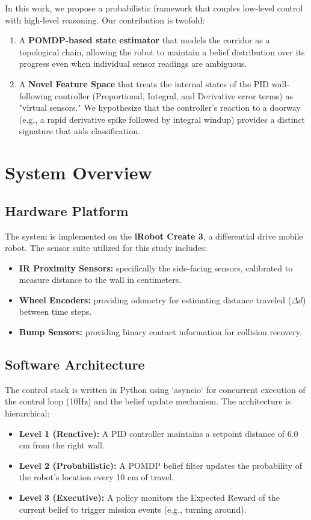 \documentclass[10pt, twocolumn]{article}
\begin{document}
In this work, we propose a probabilistic framework that couples low-level control with high-level reasoning. Our contribution is twofold:
\begin{enumerate}
    \item A \textbf{POMDP-based state estimator} that models the corridor as a topological chain, allowing the robot to maintain a belief distribution over its progress even when individual sensor readings are ambiguous.
    \item A \textbf{Novel Feature Space} that treats the internal states of the PID wall-following controller (Proportional, Integral, and Derivative error terms) as "virtual sensors." We hypothesize that the controller's reaction to a doorway (e.g., a rapid derivative spike followed by integral windup) provides a distinct signature that aids classification.
\end{enumerate}

\section{System Overview}
\subsection{Hardware Platform}
The system is implemented on the \textbf{iRobot Create 3}, a differential drive mobile robot. The sensor suite utilized for this study includes:
\begin{itemize}
    \item \textbf{IR Proximity Sensors:} specifically the side-facing sensors, calibrated to measure distance to the wall in centimeters.
    \item \textbf{Wheel Encoders:} providing odometry for estimating distance traveled (\(\Delta d\)) between time steps.
    \item \textbf{Bump Sensors:} providing binary contact information for collision recovery.
\end{itemize}

\subsection{Software Architecture}
The control stack is written in Python using `asyncio` for concurrent execution of the control loop (10Hz) and the belief update mechanism. The architecture is hierarchical:
\begin{itemize}
    \item \textbf{Level 1 (Reactive):} A PID controller maintains a setpoint distance of 6.0 cm from the right wall.
    \item \textbf{Level 2 (Probabilistic):} A POMDP belief filter updates the probability of the robot's location every 10 cm of travel.
    \item \textbf{Level 3 (Executive):} A policy monitors the Expected Reward of the current belief to trigger mission events (e.g., turning around).
\end{itemize}
\end{document}
